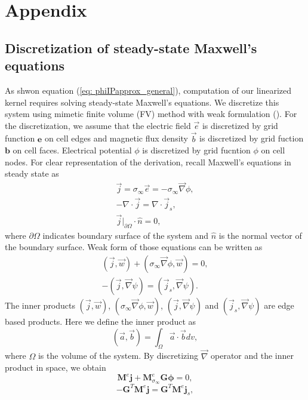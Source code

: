 \documentclass[a4paper, 11pt]{article}
\renewcommand{\div}{\nabla\cdot}
\newcommand{\grad}{\vec \nabla}
\newcommand{\siginf}{\sigma_\infty}
\newcommand{\dgrad}{{\mathbf G}}
\newcommand{\M}{{\mathbf M}}
\newcommand{\MeSigInf}{{\M^e_{\sigma_\infty}}}
\newcommand{\Me}{{\M^e}}
\renewcommand {\j}  { {\vec j} }
\renewcommand {\b}  { {\vec b} }
\newcommand {\e}  { {\vec e} }
\renewcommand {\dj}  { {\mathbf{j} } }
\newcommand {\db}  { {\mathbf{b} } }
\newcommand {\de}  { {\mathbf{e} } }
\begin{document}
\section{Appendix}
\subsection{Discretization of steady-state Maxwell's equations}
\label{section:maxwell_discrete}
As shwon equation (\ref{eq: phiIPapprox_general}), computation of our linearized kernel requires solving steady-state Maxwell's equations. 
We discretize this system using mimetic finite volume (FV) method with weak formulation (\cite{Eldadbook}). 
For the discretization, we assume that the electric field $\e$ is discretized by grid function $\de$ on cell edges and magnetic flux density $\b$ is discretized by grid fuction $\db$ on cell faces. 
Electrical potential $\phi$ is discretized by grid fucntion  $\phi$ on cell nodes. For clear representation of the derivation, recall Maxwell's equations in steady state as
\begin{align}
  \j = \siginf\e = -\siginf\grad \phi, \\
  -\div \j = \div \j_s, \\
  \j\big|_{\partial \Omega}\cdot\hat{n} = 0,
  \label{eq:DCBCneumann}
\end{align}
where $\partial \Omega$ indicates boundary surface of the system and $\hat{n}$ is the normal vector of the boundary surface. Weak form of those equations can be written as
\begin{align}
  (\j, \vec{w}) + (\siginf \grad \phi, \vec{w}) = 0, \\
  -(\j, \grad \psi) = (\j_s, \grad \psi).
\end{align}
The inner products $(\j, \vec{w})$, $(\siginf \grad \phi, \vec{w})$,  $(\j, \grad \psi)$ and $(\j_s, \grad \psi)$ are edge based products. Here we define the inner product as
\begin{equation}
  (\vec{a}, \vec{b}) = \int_{\Omega} \vec{a}\cdot\vec{b} dv,
\end{equation}
where $\Omega$ is the volume of the system. By discretizing $\grad$ operator and the inner product in space, we obtain
\begin{equation}
  \Me\dj + \MeSigInf\dgrad\boldsymbol{\phi} = 0,
  \label{eq:DCdisceq1}
\end{equation}
\begin{equation}
  -\dgrad^T \Me\dj = \dgrad^T \Me\dj_s,
  \label{eq:DCdisceq2}
\end{equation}
\end{document}
